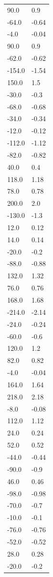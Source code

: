 \begin{longtable}{ll}
90.0 & 0.9 \\
-64.0 & -0.64 \\
-4.0 & -0.04 \\
90.0 & 0.9 \\
-62.0 & -0.62 \\
-154.0 & -1.54 \\
150.0 & 1.5 \\
-30.0 & -0.3 \\
-68.0 & -0.68 \\
-34.0 & -0.34 \\
-12.0 & -0.12 \\
-112.0 & -1.12 \\
-82.0 & -0.82 \\
40.0 & 0.4 \\
118.0 & 1.18 \\
78.0 & 0.78 \\
200.0 & 2.0 \\
-130.0 & -1.3 \\
12.0 & 0.12 \\
14.0 & 0.14 \\
-20.0 & -0.2 \\
-88.0 & -0.88 \\
132.0 & 1.32 \\
76.0 & 0.76 \\
168.0 & 1.68 \\
-214.0 & -2.14 \\
-24.0 & -0.24 \\
-60.0 & -0.6 \\
120.0 & 1.2 \\
82.0 & 0.82 \\
-4.0 & -0.04 \\
164.0 & 1.64 \\
218.0 & 2.18 \\
-8.0 & -0.08 \\
112.0 & 1.12 \\
24.0 & 0.24 \\
52.0 & 0.52 \\
-44.0 & -0.44 \\
-90.0 & -0.9 \\
46.0 & 0.46 \\
-98.0 & -0.98 \\
-70.0 & -0.7 \\
-10.0 & -0.1 \\
-76.0 & -0.76 \\
-52.0 & -0.52 \\
28.0 & 0.28 \\
-20.0 & -0.2 \\

\end{longtable}
